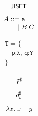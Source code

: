 \documentclass{article}
\begin{document}
\[
  \textsf{\small JISET}
\]

\[
  \begin{array}{r@{~}r@{~}l}
    A &::=& \texttt{a}\\
      &\mid& B ~ C
  \end{array}
\]

\[
  \begin{array}{l}
    \texttt{T = \{}\\
    \quad \texttt{p:X, q:Y}\\
    \texttt{\}}\\
  \end{array}
\]

\[
  F^\sharp
\]


\[
  d_\iota^\sharp
\]

\[
  \lambda x. \; x + y
\]
\end{document}
